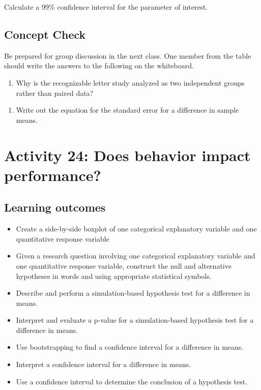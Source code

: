 \documentclass[
]{report}
\providecommand{\tightlist}{%
  \setlength{\itemsep}{0pt}\setlength{\parskip}{0pt}}
\begin{document}
Calculate a 99\% confidence interval for the parameter of interest.

\vspace{0.6in}

\subsection{Concept Check}\label{concept-check-9}

Be prepared for group discussion in the next class. One member from the table should write the answers to the following on the whiteboard.

\begin{enumerate}
\def\labelenumi{\arabic{enumi}.}
\tightlist
\item
  Why is the recognizable letter study analyzed as two independent groups rather than paired data?
\end{enumerate}

\vspace{0.6in}

\begin{enumerate}
\def\labelenumi{\arabic{enumi}.}
\setcounter{enumi}{1}
\tightlist
\item
  Write out the equation for the standard error for a difference in sample means.
\end{enumerate}

\vspace{1in}

\newpage

\section{Activity 24: Does behavior impact performance?}\label{activity-24-does-behavior-impact-performance}


\subsection{Learning outcomes}\label{learning-outcomes-27}

\begin{itemize}
\item
  Create a side-by-side boxplot of one categorical explanatory variable and one quantitative response variable
\item
  Given a research question involving one categorical explanatory variable and one quantitative response variable, construct the null and alternative hypotheses
  in words and using appropriate statistical symbols.
\item
  Describe and perform a simulation-based hypothesis test for a difference in means.
\item
  Interpret and evaluate a p-value for a simulation-based hypothesis test for a difference in means.
\item
  Use bootstrapping to find a confidence interval for a difference in means.
\item
  Interpret a confidence interval for a difference in means.
\item
  Use a confidence interval to determine the conclusion of a hypothesis test.
\end{itemize}
\end{document}

